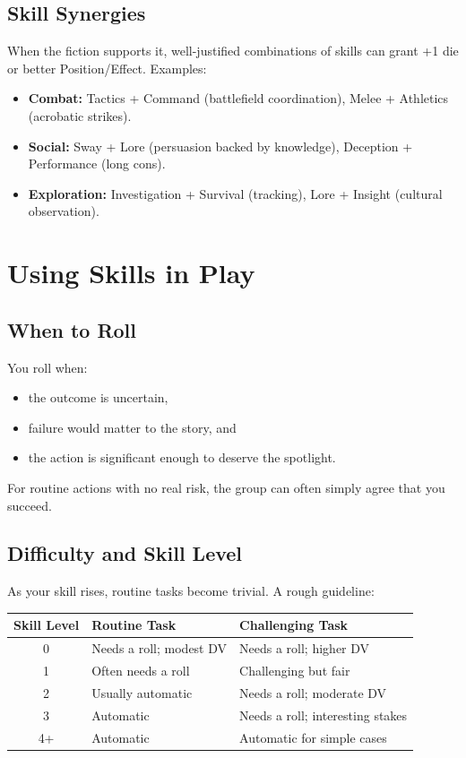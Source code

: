 \subsection{Skill Synergies}
\label{sec:skill-synergies}
When the fiction supports it, well-justified combinations of skills can grant
+1 die or better Position/Effect. Examples:
\begin{itemize}
  \item \textbf{Combat:} Tactics + Command (battlefield coordination), Melee + Athletics (acrobatic strikes).
  \item \textbf{Social:} Sway + Lore (persuasion backed by knowledge), Deception + Performance (long cons).
  \item \textbf{Exploration:} Investigation + Survival (tracking), Lore + Insight (cultural observation).
\end{itemize}

\section{Using Skills in Play}
\label{sec:using-skills}

\subsection{When to Roll}
\label{sec:when-to-roll}
You roll when:
\begin{itemize}
  \item the outcome is uncertain,
  \item failure would matter to the story, and
  \item the action is significant enough to deserve the spotlight.
\end{itemize}
For routine actions with no real risk, the group can often simply agree that
you succeed.

\subsection{Difficulty and Skill Level}
\label{sec:difficulty-skill}
As your skill rises, routine tasks become trivial. A rough guideline:

\begin{center}
\begin{tabular}{cll}
\toprule
\textbf{Skill Level} & \textbf{Routine Task} & \textbf{Challenging Task} \\
\midrule
0 & Needs a roll; modest DV & Needs a roll; higher DV \\
1 & Often needs a roll & Challenging but fair \\
2 & Usually automatic & Needs a roll; moderate DV \\
3 & Automatic & Needs a roll; interesting stakes \\
4+ & Automatic & Automatic for simple cases \\
\bottomrule
\end{tabular}
\end{center}

